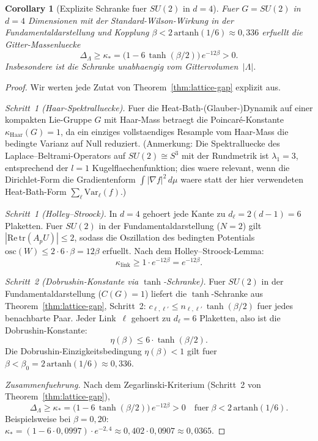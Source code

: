 \documentclass[12pt,a4paper]{article}
\theoremstyle{definition}
\theoremstyle{plain}
\newtheorem{corollary}[definition]{Corollary}
\theoremstyle{remark}
\begin{document}
\begin{corollary}[Explizite Schranke fuer $SU(2)$ in $d=4$]
\label{cor:su2-explicit}
Fuer $G = SU(2)$ in $d = 4$ Dimensionen mit der Standard-Wilson-Wirkung in der Fundamentaldarstellung und Kopplung $\beta < 2\,\mathrm{artanh}(1/6) \approx 0{,}336$ erfuellt die Gitter-Massenluecke
\begin{equation}\label{eq:su2-gap}
    \Delta_\Lambda \geq \kappa_* = \bigl(1 - 6\,\tanh(\beta/2)\bigr)\,e^{-12\beta} > 0.
\end{equation}
Insbesondere ist die Schranke unabhaengig vom Gittervolumen~$|\Lambda|$.
\end{corollary}

\begin{proof}
Wir werten jede Zutat von Theorem~\ref{thm:lattice-gap} explizit aus.

\emph{Schritt~1 (Haar-Spektralluecke).} Fuer die Heat-Bath-(Glauber-)Dynamik auf einer kompakten Lie-Gruppe $G$ mit Haar-Mass betraegt die Poincar\'e-Konstante $\kappa_{\mathrm{Haar}}(G) = 1$, da ein einziges vollstaendiges Resample vom Haar-Mass die bedingte Varianz auf Null reduziert. (Anmerkung: Die Spektralluecke des Laplace--Beltrami-Operators auf $SU(2) \cong S^3$ mit der Rundmetrik ist $\lambda_1 = 3$, entsprechend der $l=1$ Kugelflaechen\-funktion; dies waere relevant, wenn die Dirichlet-Form die Gradientenform $\int |\nabla f|^2\,d\mu$ waere statt der hier verwendeten Heat-Bath-Form $\sum_\ell \mathrm{Var}_\ell(f)$.)

\emph{Schritt~1 (Holley--Stroock).} In $d=4$ gehoert jede Kante zu $d_\ell = 2(d-1) = 6$ Plaketten. Fuer $SU(2)$ in der Fundamentaldarstellung ($N=2$) gilt $|\mathrm{Re}\,\mathrm{tr}(A_p U)| \leq 2$, sodass die Oszillation des bedingten Potentials $\mathrm{osc}(W) \leq 2 \cdot 6 \cdot \beta = 12\beta$ erfuellt. Nach dem Holley--Stroock-Lemma:
\[
    \kappa_{\mathrm{link}} \geq 1 \cdot e^{-12\beta} = e^{-12\beta}.
\]

\emph{Schritt~2 (Dobrushin-Konstante via $\tanh$-Schranke).} Fuer $SU(2)$ in der Fundamentaldarstellung ($C(G) = 1$) liefert die $\tanh$-Schranke aus Theorem~\ref{thm:lattice-gap}, Schritt~2: $c_{\ell,\ell'} \leq n_{\ell,\ell'}\,\tanh(\beta/2)$ fuer jedes benachbarte Paar. Jeder Link~$\ell$ gehoert zu $d_\ell = 6$ Plaketten, also ist die Dobrushin-Konstante:
\[
    \eta(\beta) \leq 6 \cdot \tanh(\beta/2).
\]
Die Dobrushin-Einzigkeitsbedingung $\eta(\beta) < 1$ gilt fuer $\beta < \beta_0 = 2\,\mathrm{artanh}(1/6) \approx 0{,}336$.

\emph{Zusammenfuehrung.} Nach dem Zegarlinski-Kriterium (Schritt~2 von Theorem~\ref{thm:lattice-gap}),
\[
    \Delta_\Lambda \geq \kappa_* = \bigl(1 - 6\,\tanh(\beta/2)\bigr)\,e^{-12\beta} > 0 \quad\text{fuer}\;\beta < 2\,\mathrm{artanh}(1/6).
\]
Beispielsweise bei $\beta = 0{,}20$: $\kappa_* = (1 - 6 \cdot 0{,}0997)\cdot e^{-2{,}4} \approx 0{,}402 \cdot 0{,}0907 \approx 0{,}0365$.
\end{proof}
\end{document}
